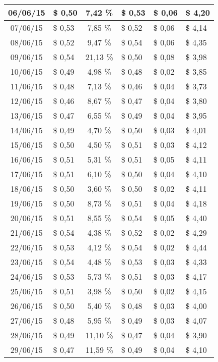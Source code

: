 \begin{center}
\begin{small}
\begin{longtable}{|c|l|c|l|l|l|}
06/06/15 & \$ 0,50 & 7,42 \% & \$ 0,53 & \$ 0,06 & \$ 4,20 \\ \hline
07/06/15 & \$ 0,53 & 7,85 \% & \$ 0,52 & \$ 0,06 & \$ 4,14 \\ \hline
08/06/15 & \$ 0,52 & 9,47 \% & \$ 0,54 & \$ 0,06 & \$ 4,35 \\ \hline
09/06/15 & \$ 0,54 & 21,13 \% & \$ 0,50 & \$ 0,08 & \$ 3,98 \\ \hline
10/06/15 & \$ 0,49 & 4,98 \% & \$ 0,48 & \$ 0,02 & \$ 3,85 \\ \hline
11/06/15 & \$ 0,48 & 7,13 \% & \$ 0,46 & \$ 0,04 & \$ 3,73 \\ \hline
12/06/15 & \$ 0,46 & 8,67 \% & \$ 0,47 & \$ 0,04 & \$ 3,80 \\ \hline
13/06/15 & \$ 0,47 & 6,55 \% & \$ 0,49 & \$ 0,04 & \$ 3,95 \\ \hline
14/06/15 & \$ 0,49 & 4,70 \% & \$ 0,50 & \$ 0,03 & \$ 4,01 \\ \hline
15/06/15 & \$ 0,50 & 4,50 \% & \$ 0,51 & \$ 0,03 & \$ 4,12 \\ \hline
16/06/15 & \$ 0,51 & 5,31 \% & \$ 0,51 & \$ 0,05 & \$ 4,11 \\ \hline
17/06/15 & \$ 0,51 & 6,10 \% & \$ 0,50 & \$ 0,04 & \$ 4,10 \\ \hline
18/06/15 & \$ 0,50 & 3,60 \% & \$ 0,50 & \$ 0,02 & \$ 4,11 \\ \hline
19/06/15 & \$ 0,50 & 8,73 \% & \$ 0,51 & \$ 0,04 & \$ 4,18 \\ \hline
20/06/15 & \$ 0,51 & 8,55 \% & \$ 0,54 & \$ 0,05 & \$ 4,40 \\ \hline
21/06/15 & \$ 0,54 & 4,38 \% & \$ 0,52 & \$ 0,02 & \$ 4,29 \\ \hline
22/06/15 & \$ 0,53 & 4,12 \% & \$ 0,54 & \$ 0,02 & \$ 4,44 \\ \hline
23/06/15 & \$ 0,54 & 4,48 \% & \$ 0,53 & \$ 0,03 & \$ 4,33 \\ \hline
24/06/15 & \$ 0,53 & 5,73 \% & \$ 0,51 & \$ 0,03 & \$ 4,17 \\ \hline
25/06/15 & \$ 0,51 & 3,98 \% & \$ 0,50 & \$ 0,02 & \$ 4,15 \\ \hline
26/06/15 & \$ 0,50 & 5,40 \% & \$ 0,48 & \$ 0,03 & \$ 4,00 \\ \hline
27/06/15 & \$ 0,48 & 5,95 \% & \$ 0,49 & \$ 0,03 & \$ 4,07 \\ \hline
28/06/15 & \$ 0,49 & 11,10 \% & \$ 0,47 & \$ 0,04 & \$ 3,90 \\ \hline
29/06/15 & \$ 0,47 & 11,59 \% & \$ 0,49 & \$ 0,04 & \$ 4,10 \\ \hline

\end{longtable}
\end{small}
\end{center}
